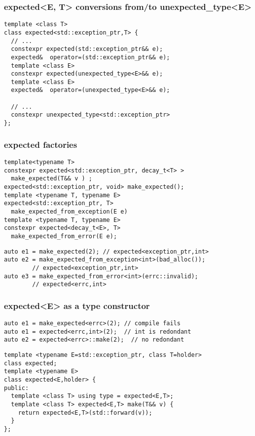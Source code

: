 \documentclass[xcolor=dvipsnames]{beamer}
\begin{document}
\begin{frame}[fragile]
\frametitle{expected<E, T> conversions from/to unexpected\_type<E>}

\begin{lstlisting}
template <class T>
class expected<std::exception_ptr,T> {
  // ...
  constexpr expected(std::exception_ptr&& e);
  expected&  operator=(std::exception_ptr&& e);
  template <class E>
  constexpr expected(unexpected_type<E>&& e);
  template <class E>
  expected&  operator=(unexpected_type<E>&& e);

  // ...  
  constexpr unexpected_type<std::exception_ptr> 
};
\end{lstlisting}

\end{frame}
\begin{frame}[fragile]
\frametitle{expected factories}

\begin{lstlisting}
template<typename T>
constexpr expected<std::exception_ptr, decay_t<T> > 
  make_expected(T&& v ) ;
expected<std::exception_ptr, void> make_expected();
template <typename T, typename E>
expected<std::exception_ptr, T> 
  make_expected_from_exception(E e)
template <typename T, typename E>
constexpr expected<decay_t<E>, T> 
  make_expected_from_error(E e);
\end{lstlisting}
\begin{lstlisting}
auto e1 = make_expected(2); // expected<exception_ptr,int>
auto e2 = make_expected_from_exception<int>(bad_alloc()); 
		// expected<exception_ptr,int>
auto e3 = make_expected_from_error<int>(errc::invalid); 
		// expected<errc,int>
\end{lstlisting}
\end{frame}
\begin{frame}[fragile]
\frametitle{expected<E> as a type constructor}

\begin{lstlisting}
auto e1 = make_expected<errc>(2); // compile fails
auto e1 = expected<errc,int>(2);  // int is redondant
auto e2 = expected<errc>::make(2);  // no redondant
\end{lstlisting}

\begin{lstlisting}
template <typename E=std::exception_ptr, class T=holder>
class expected;
template <typename E>
class expected<E,holder> {
public:
  template <class T> using type = expected<E,T>;
  template <class T> expected<E,T> make(T&& v) {
    return expected<E,T>(std::forward(v));
  }
};
\end{lstlisting}
\end{frame}
\end{document}
